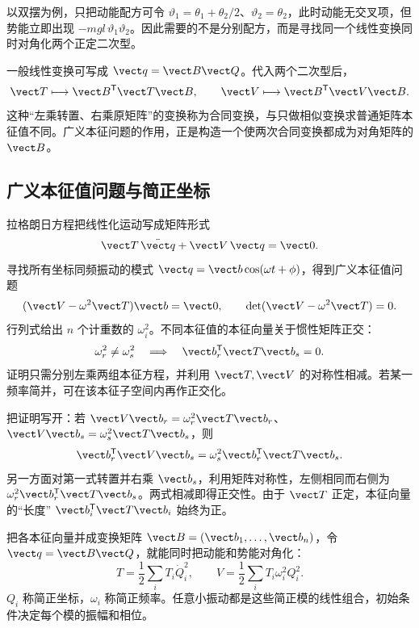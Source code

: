 以双摆为例，只把动能配方可令
$\vartheta_1=\theta_1+\theta_2/2$、$\vartheta_2=\theta_2$，此时动能无交叉项，但势能立即出现
$-mgl\,\vartheta_1\vartheta_2$。因此需要的不是分别配方，而是寻找同一个线性变换同时对角化两个正定二次型。

一般线性变换可写成 $\vect q=\vect B\vect Q$。代入两个二次型后，
\[
 \vect T\longmapsto\vect B^{\mathsf T}\vect T\vect B,\qquad
 \vect V\longmapsto\vect B^{\mathsf T}\vect V\vect B.
\]
这种“左乘转置、右乘原矩阵”的变换称为合同变换，与只做相似变换求普通矩阵本征值不同。广义本征问题的作用，正是构造一个使两次合同变换都成为对角矩阵的 $\vect B$。
\figDoublePendulum

\subsection{广义本征值问题与简正坐标}

拉格朗日方程把线性化运动写成矩阵形式
\begin{equation}
 \vect T\,\ddot{\vect q}+\vect V\,\vect q=\vect0.
 \label{r2ch04:eq:022}
\end{equation}
寻找所有坐标同频振动的模式 $\vect q=\vect b\cos(\omega t+\phi)$，得到广义本征值问题
\begin{equation}
 (\vect V-\omega^2\vect T)\vect b=\vect0,\qquad
 \det(\vect V-\omega^2\vect T)=0.
 \label{r2ch04:eq:023}
\end{equation}
行列式给出 $n$ 个计重数的 $\omega_i^2$。不同本征值的本征向量关于惯性矩阵正交：
\begin{equation}
 \omega_r^2\ne\omega_s^2
 \quad\Longrightarrow\quad
 \vect b_r^{\mathsf T}\vect T\vect b_s=0.
 \label{r2ch04:eq:024}
\end{equation}
证明只需分别左乘两组本征方程，并利用 $\vect T,\vect V$ 的对称性相减。若某一频率简并，可在该本征子空间内再作正交化。

把证明写开：若
$\vect V\vect b_r=\omega_r^2\vect T\vect b_r$、
$\vect V\vect b_s=\omega_s^2\vect T\vect b_s$，则
\[
 \vect b_r^{\mathsf T}\vect V\vect b_s
 =\omega_s^2\vect b_r^{\mathsf T}\vect T\vect b_s.
\]
另一方面对第一式转置并右乘 $\vect b_s$，利用矩阵对称性，左侧相同而右侧为
$\omega_r^2\vect b_r^{\mathsf T}\vect T\vect b_s$。两式相减即得正交性。由于 $\vect T$ 正定，本征向量的“长度”
$\vect b_i^{\mathsf T}\vect T\vect b_i$ 始终为正。

把各本征向量并成变换矩阵 $\vect B=(\vect b_1,\ldots,\vect b_n)$，令 $\vect q=\vect B\vect Q$，就能同时把动能和势能对角化：
\[
 T=\frac12\sum_iT_i\dot Q_i^2,\qquad
 V=\frac12\sum_iT_i\omega_i^2Q_i^2.
\]
$Q_i$ 称简正坐标，$\omega_i$ 称简正频率。任意小振动都是这些简正模的线性组合，初始条件决定每个模的振幅和相位。

